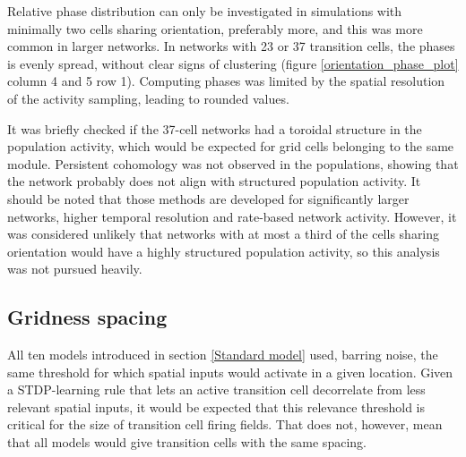 \documentclass{article}
\begin{document}
    Relative phase distribution can only be investigated in simulations with minimally two cells sharing orientation, preferably more, and this was more common in larger networks. In networks with 23 or 37 transition cells, the phases is evenly spread, without clear signs of clustering (figure \ref{orientation_phase_plot} column 4 and 5 row 1). Computing phases was limited by the spatial resolution of the activity sampling, leading to rounded values.
    
    It was briefly checked if the 37-cell networks had a toroidal structure in the population activity, which would be expected for grid cells belonging to the same module. Persistent cohomology was not observed in the populations, showing that the network probably does not align with structured population activity. It should be noted that those methods are developed for significantly larger networks, higher temporal resolution and rate-based network activity. However, it was considered unlikely that networks with at most a third of the cells sharing orientation would have a highly structured population activity, so this analysis was not pursued heavily.

    \subsection{Gridness spacing} \label{Spacing}

    All ten models introduced in section \ref{Standard model} used, barring noise, the same threshold for which spatial inputs would activate in a given location. Given a STDP-learning rule that lets an active transition cell decorrelate from less relevant spatial inputs, it would be expected that this relevance threshold is critical for the size of transition cell firing fields. That does not, however, mean that all models would give transition cells with the same spacing.
\end{document}
